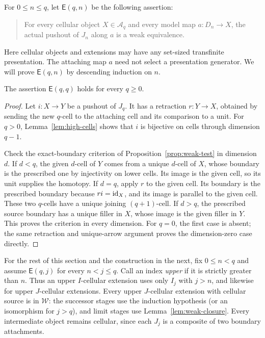 For $0\leq n\leq q$, let $\mathsf E(q,n)$ be the following assertion:
\begin{quote}
For every cellular object $X\in\mathcal A_q$ and every model map
$a:D_n\to X$, the actual pushout of $J_n$ along $a$ is a weak
equivalence.
\end{quote}
Here cellular objects and extensions may have any set-sized
transfinite presentation.  The attaching map $a$ need not select
a presentation generator.  We will prove $\mathsf E(q,n)$ by
descending induction on $n$.

\begin{lemma}\label{lem:cutoff-base}
The assertion $\mathsf E(q,q)$ holds for every $q\geq0$.
\end{lemma}

\begin{proof}
Let $i:X\to Y$ be a pushout of $J_q$.  It has a retraction
$r:Y\to X$, obtained by sending the new $q$-cell to the attaching
cell and its comparison to a unit.  For $q>0$,
Lemma~\ref{lem:high-cells} shows that $i$ is bijective on cells
through dimension $q-1$.

Check the exact-boundary criterion of
Proposition~\ref{prop:weak-test} in dimension $d$.  If $d<q$, the
given $d$-cell of $Y$ comes from a unique $d$-cell of $X$, whose
boundary is the prescribed one by injectivity on lower cells.
Its image is the given cell, so its unit supplies the homotopy.
If $d=q$, apply $r$ to the given cell.  Its boundary is the
prescribed boundary because $ri=\mathrm{id}_X$, and its image is parallel
to the given cell.  These two $q$-cells have a unique joining
$(q+1)$-cell.  If $d>q$, the prescribed source boundary has a
unique filler in $X$, whose image is the given filler in $Y$.
This proves the criterion in every dimension.
For $q=0$, the first case is absent; the same retraction and
unique-arrow argument proves the dimension-zero case directly.
\end{proof}

For the rest of this section and the construction in the next,
fix $0\leq n<q$ and assume $\mathsf E(q,j)$ for every
$n<j\leq q$.  Call an index \emph{upper} if it is strictly greater
than $n$.  Thus an upper $I$-cellular extension uses only $I_j$
with $j>n$, and likewise for upper $J$-cellular extensions.
Every upper $J$-cellular extension with cellular source is in
$\mathcal W$: the successor stages use the induction hypothesis
(or an isomorphism for $j>q$), and limit stages use
Lemma~\ref{lem:weak-closure}.  Every intermediate object remains
cellular, since each $J_j$ is a composite of two boundary
attachments.

